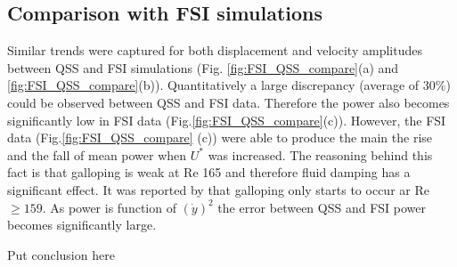  

\subsection{Comparison with FSI simulations}
 Similar trends were captured for both displacement and velocity amplitudes between QSS and FSI simulations (Fig. \ref{fig:FSI_QSS_compare}(a) and \ref{fig:FSI_QSS_compare}(b)). Quantitatively a large discrepancy (average of $30\%$) could be observed between QSS and FSI data. Therefore the power also becomes significantly low in FSI data (Fig.\ref{fig:FSI_QSS_compare}(c)). However, the FSI data (Fig.\ref{fig:FSI_QSS_compare} (c)) were able to produce the main the rise and the fall of mean power when $U^*$ was increased. The reasoning behind this fact is that galloping is weak at Re 165  and therefore fluid damping has a significant effect. It was reported by \cite{Barrero-Gil2009} that galloping only starts to occur ar Re $\geq 159$. As power is function of $(\dot{y})^2$ the error between QSS and FSI power becomes significantly large.  
 
 Put conclusion here 
 
 










 

 
 
 

 
 



 
 
 
 
 
 
 
 
 
 
  
 
 